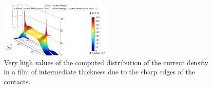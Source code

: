 \begin{figure} [!ht]
\begin{center}
       \includegraphics[width=0.5\textwidth]{./edmr/fingers1/pics/3_intermediate_film_2.png}
       \end{center}
\caption{Very high values of the computed distribution of the current density in a film of intermediate thickness due to the sharp edges of the contacts.}
     \label{fig:dits_singular}
\end{figure}


